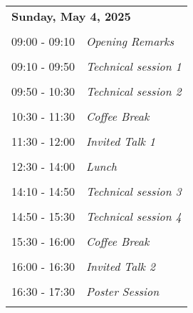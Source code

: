 \documentclass[11pt,oneside]{book}
\begin{document}
        \begin{tabular}{p{24mm}p{124mm}}
    \multicolumn{2}{l}{\bf Sunday, May 4, 2025 } \\\\
                09:00 - 09:10 & \emph{Opening Remarks}\\\\
      
                      09:10 - 09:50 & \emph{Technical session 1}\\\\
      
                      09:50 - 10:30 & \emph{Technical session 2}\\\\
      
                      10:30 - 11:30 & \emph{Coffee Break}\\\\
      
                      11:30 - 12:00 & \emph{Invited Talk 1}\\\\
      
                      12:30 - 14:00 & \emph{Lunch}\\\\
      
                      14:10 - 14:50 & \emph{Technical session  3}\\\\
      
                      14:50 - 15:30 & \emph{Technical session 4}\\\\
      
                      15:30 - 16:00 & \emph{Coffee Break}\\\\
      
                      16:00 - 16:30 & \emph{Invited Talk 2}\\\\
      
                      16:30 - 17:30 & \emph{Poster Session}\\\\
      
              \end{tabular}
    \newpage
      
\end{document}
